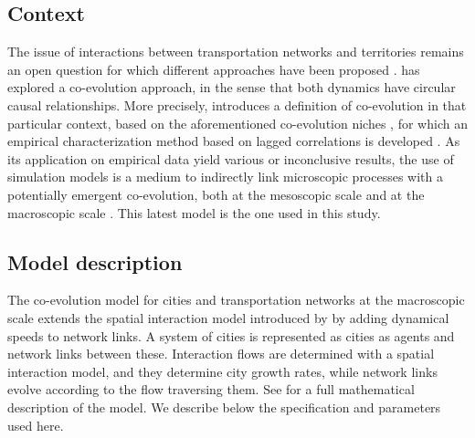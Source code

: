 \documentclass[11pt]{article}
\begin{document}
\subsection{Context}

The issue of interactions between transportation networks and territories remains an open question for which different approaches have been proposed \cite{offner1993effets,espacegeo2014effets}. \cite{raimbault2018caracterisation} has explored a co-evolution approach, in the sense that both dynamics have circular causal relationships. More precisely, \cite{raimbault2019modeling} introduces a definition of co-evolution in that particular context, based on the aforementioned co-evolution niches \citep{holland2012signals}, for which an empirical characterization method based on lagged correlations is developed \citep{raimbault2017identification}. As its application on empirical data yield various or inconclusive results, the use of simulation models is a medium to indirectly link microscopic processes with a potentially emergent co-evolution, both at the mesoscopic scale \citep{raimbault2019urban} and at the macroscopic scale \citep{raimbault2018modeling}. This latest model is the one used in this study.

\subsection{Model description}

The co-evolution model for cities and transportation networks at the macroscopic scale extends the spatial interaction model introduced by \cite{raimbault2018indirect} by adding dynamical speeds to network links. A system of cities is represented as cities as agents and network links between these. Interaction flows are determined with a spatial interaction model, and they determine city growth rates, while network links evolve according to the flow traversing them. See \cite{raimbault2018modeling} for a full mathematical description of the model. We describe below the specification and parameters used here.
\end{document}
